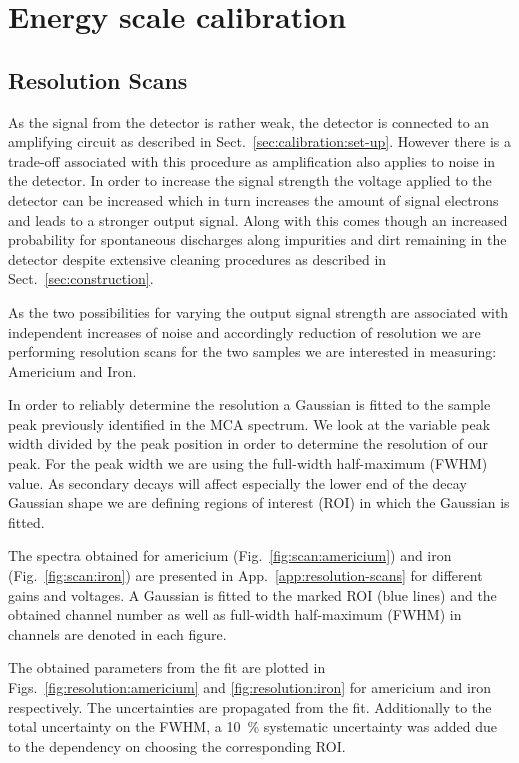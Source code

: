 \section{Energy scale calibration}
\label{sec:energy_scan}

\subsection{Resolution Scans}
\label{sec:resolution_scans}
As the signal from the detector is rather weak, the detector is connected to an
amplifying circuit as described in Sect.~\ref{sec:calibration:set-up}. However
there is a trade-off associated with this procedure as amplification also
applies to noise in the detector. In order to increase the signal strength the
voltage applied to the detector can be increased which in turn increases the
amount of signal electrons and leads to a stronger output signal. Along with
this comes though an increased probability for spontaneous discharges along
impurities and dirt remaining in the detector despite extensive cleaning
procedures as described in Sect.~\ref{sec:construction}.

As the two possibilities for varying the output signal strength are associated
with independent increases of noise and accordingly reduction of resolution we
are performing resolution scans for the two samples we are interested in
measuring: Americium and Iron.

In order to reliably determine the resolution a Gaussian is fitted to the sample
peak previously identified in the MCA spectrum. We look
at the variable peak width divided by the peak position in order to determine
the resolution of our peak. For the peak width we are using the full-width
half-maximum (FWHM) value. As secondary decays will affect especially the lower
end of the decay Gaussian shape we are defining regions of interest (ROI) in which the Gaussian
is fitted.

The spectra obtained for americium (Fig.~\ref{fig:scan:americium}) and iron
(Fig.~\ref{fig:scan:iron}) are presented in App.~\ref{app:resolution-scans} for different gains and voltages.
A Gaussian is fitted to the marked ROI (blue lines) and the obtained channel number as well as
full-width half-maximum (FWHM) in channels are denoted in each figure.

The obtained parameters from the fit are plotted in Figs.~\ref{fig:resolution:americium} and \ref{fig:resolution:iron} for americium and
iron respectively. The uncertainties are propagated from the fit. Additionally to the
total uncertainty on the FWHM, a \SI{10}{\percent} systematic
uncertainty was added due to the dependency on choosing the corresponding ROI.

